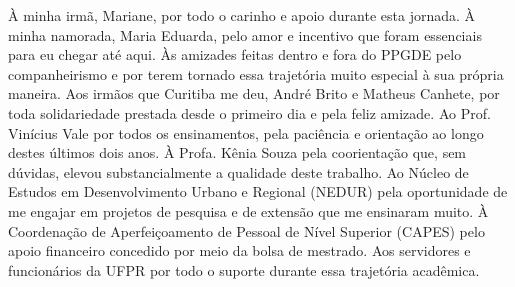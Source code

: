 

\begin{agradecimentos}
	À minha irmã, Mariane, por todo o carinho e apoio durante esta jornada. À minha namorada, Maria Eduarda, pelo amor e incentivo que foram essenciais para eu chegar até aqui. Às amizades feitas dentro e fora do PPGDE pelo companheirismo e por terem tornado essa trajetória muito especial à sua própria maneira. Aos irmãos que Curitiba me deu, André Brito e Matheus Canhete, por toda solidariedade prestada desde o primeiro dia e pela feliz amizade. Ao Prof. Vinícius Vale por todos os ensinamentos, pela paciência e orientação ao longo destes últimos dois anos. À Profa. Kênia Souza pela coorientação que, sem dúvidas, elevou substancialmente a qualidade deste trabalho. Ao Núcleo de Estudos em Desenvolvimento Urbano e Regional (NEDUR) pela oportunidade de me engajar em projetos de pesquisa e de extensão que me ensinaram muito. À Coordenação de Aperfeiçoamento de Pessoal de Nível Superior (CAPES) pelo apoio financeiro concedido por meio da bolsa de mestrado. Aos servidores e funcionários da UFPR por todo o suporte durante essa trajetória acadêmica.
\end{agradecimentos}


